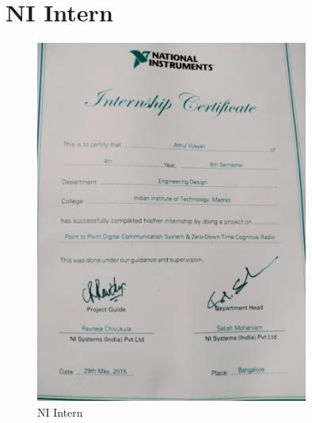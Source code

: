 \documentclass[11pt]{article}
\begin{document}
{\section{NI Intern}
\begin{figure}[h]
\centering
\includegraphics[width=0.8\textwidth]{ni.jpg}
\caption{NI Intern}
\label{gauss}
\end{figure}
\FloatBarrier

}
\end{document}
